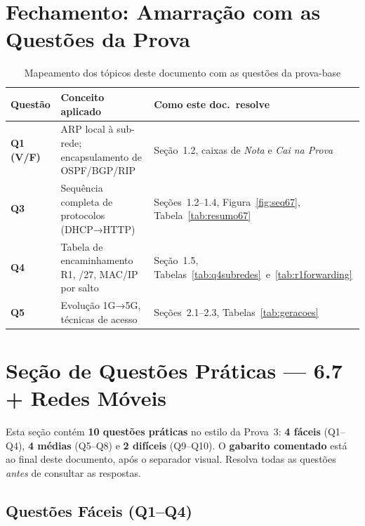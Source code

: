 \documentclass[11pt,a4paper]{article}
\begin{document}
\hrulefill

\section*{Fechamento: Amarração com as Questões da Prova}

\begin{table}[h!]
\centering
\caption{Mapeamento dos tópicos deste documento com as questões da prova-base}
\label{tab:relacao_prova}
\begin{tabularx}{\textwidth}{lXX}
\toprule
\textbf{Questão} & \textbf{Conceito aplicado} & \textbf{Como este doc.\ resolve} \\
\midrule
\textbf{Q1 (V/F)} & ARP local à sub-rede; encapsulamento de OSPF/BGP/RIP & Seção~1.2, caixas de \textit{Nota} e \textit{Cai na Prova} \\
\textbf{Q3} & Sequência completa de protocolos (DHCP→HTTP) & Seções~1.2--1.4, Figura~\ref{fig:seq67}, Tabela~\ref{tab:resumo67} \\
\textbf{Q4} & Tabela de encaminhamento R1, /27, MAC/IP por salto & Seção~1.5, Tabelas~\ref{tab:q4subredes}~e~\ref{tab:r1forwarding} \\
\textbf{Q5} & Evolução 1G→5G, técnicas de acesso & Seções~2.1--2.3, Tabelas~\ref{tab:geracoes} \\
\bottomrule
\end{tabularx}
\end{table}

\hrulefill

\section*{Seção de Questões Práticas --- 6.7 + Redes Móveis}

\begin{nota}
Esta seção contém \textbf{10 questões práticas} no estilo da Prova~3: \textbf{4 fáceis} (Q1--Q4), \textbf{4 médias} (Q5--Q8) e \textbf{2 difíceis} (Q9--Q10). O \textbf{gabarito comentado} está ao final deste documento, após o separador visual. Resolva todas as questões \emph{antes} de consultar as respostas.
\end{nota}

\subsection*{Questões Fáceis (Q1--Q4)}
\end{document}
